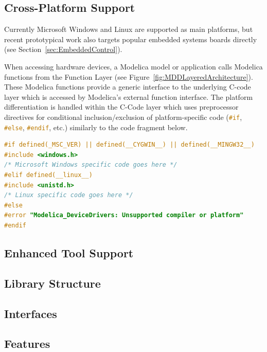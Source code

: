 \documentclass{resources/modelica}
\newcommand{\clang}[1]{\lstinline[language=c]|#1|}
\begin{document}
\subsection{Cross-Platform Support}
\label{sec:CrossPlatformSupport}

Currently Microsoft Windows and Linux are supported as main platforms, but recent
prototypical work also targets popular embedded systems boards directly (see
Section~\ref{sec:EmbeddedControl}).

When accessing hardware devices, a Modelica model or
application calls Modelica functions from the \textsf{Function Layer} (see
Figure~\ref{fig:MDDLayeredArchitecture}). These Modelica functions provide a
generic interface to the underlying C-code layer which is accessed by
Modelica's external function interface.
The platform differentiation is handled within the \textsf{C-Code} layer which
uses preprocessor directives for conditional inclusion/exclusion of
platform-specific code (\mbox{\clang{#if}}, \clang{#else}, \clang{#endif}, etc.)
similarly to the code fragment below.
\begin{lstlisting}[language=C]
#if defined(_MSC_VER) || defined(__CYGWIN__) || defined(__MINGW32__)
#include <windows.h>
/* Microsoft Windows specific code goes here */
#elif defined(__linux__)
#include <unistd.h>
/* Linux specific code goes here */
#else
#error "Modelica_DeviceDrivers: Unsupported compiler or platform"
#endif
\end{lstlisting}

\subsection{Enhanced Tool Support}
\subsection{Library Structure}
\subsection{Interfaces}

\subsection{Features}
\end{document}
